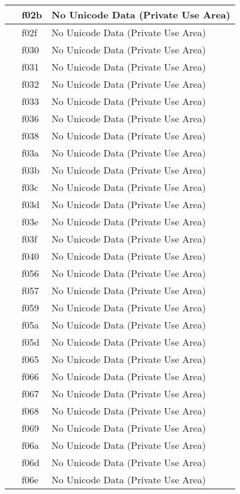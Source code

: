 \documentclass[12pt,letterpaper,openany]{book}
\begin{document}
\begin{center}
\begin{supertabular}{|m{0.25in}|m{0.5in}|m{4in}|}
 & f02b & No Unicode Data (Private Use Area)\\\hline
 & f02f & No Unicode Data (Private Use Area)\\\hline
 & f030 & No Unicode Data (Private Use Area)\\\hline
 & f031 & No Unicode Data (Private Use Area)\\\hline
 & f032 & No Unicode Data (Private Use Area)\\\hline
 & f033 & No Unicode Data (Private Use Area)\\\hline
 & f036 & No Unicode Data (Private Use Area)\\\hline
 & f038 & No Unicode Data (Private Use Area)\\\hline
 & f03a & No Unicode Data (Private Use Area)\\\hline
 & f03b & No Unicode Data (Private Use Area)\\\hline
 & f03c & No Unicode Data (Private Use Area)\\\hline
 & f03d & No Unicode Data (Private Use Area)\\\hline
 & f03e & No Unicode Data (Private Use Area)\\\hline
 & f03f & No Unicode Data (Private Use Area)\\\hline
 & f040 & No Unicode Data (Private Use Area)\\\hline
 & f056 & No Unicode Data (Private Use Area)\\\hline
 & f057 & No Unicode Data (Private Use Area)\\\hline
 & f059 & No Unicode Data (Private Use Area)\\\hline
 & f05a & No Unicode Data (Private Use Area)\\\hline
 & f05d & No Unicode Data (Private Use Area)\\\hline
 & f065 & No Unicode Data (Private Use Area)\\\hline
 & f066 & No Unicode Data (Private Use Area)\\\hline
 & f067 & No Unicode Data (Private Use Area)\\\hline
 & f068 & No Unicode Data (Private Use Area)\\\hline
 & f069 & No Unicode Data (Private Use Area)\\\hline
 & f06a & No Unicode Data (Private Use Area)\\\hline
 & f06d & No Unicode Data (Private Use Area)\\\hline
 & f06e & No Unicode Data (Private Use Area)\\\hline

\end{supertabular}
\end{center}
\end{document}
